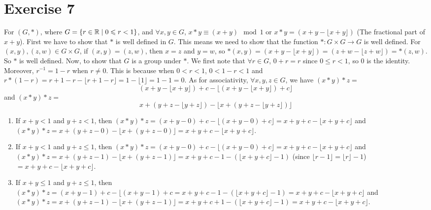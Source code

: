 \documentclass[12pt]{article}
\begin{document}
    \section*{Exercise 7}
    For $(G, \ast)$, where $G = \{r \in \mathbb{R} \mid 0 \leqslant r < 1\}$,
    and $\forall x, y \in G$, 
    $x \ast y \equiv (x + y) \mod{1}$
    or $x \ast y = (x + y - \lfloor x + y \rfloor)$
    (The fractional part of $x + y$).
    First we have to show that $\ast$ is well defined in $G$. 
    This means we need to show that the function $\ast:G \times G \to G$
    is well defined.
    For $(x, y), (z, w) \in G \times G$,
    if $(x, y) = (z, w)$,
    then $x = z$ and $y = w$,
    so $\ast(x, y) 
    = (x + y - \lfloor x + y \rfloor) 
    = (z + w - \lfloor z + w \rfloor) 
    = \ast(z, w)$.
    So $\ast$ is well defined.
    Now, to show that $G$ is a group under $\ast$.
    We first note that $\forall r \in G$, $0 + r = r$
    since $0 \leqslant r < 1$,
    so $0$ is the identity.
    Moreover, $r^{-1} = 1 - r$
    when $r \neq 0$.
    This is because when $0 < r < 1$, $0 < 1 - r < 1$
    and $r \ast (1 - r) 
    = r + 1 - r - \lfloor r + 1 - r \rfloor 
    = 1 - \lfloor 1 \rfloor 
    = 1 - 1 = 0$.
    As for associativity, $\forall x, y, z \in G$,
    we have $(x \ast y) \ast z = $
    \[(x + y - \lfloor x + y \rfloor) + c -
    \lfloor (x + y - \lfloor x + y \rfloor) + c \rfloor\]
    and $(x \ast y) \ast z = $
    \[x + (y + z - \lfloor y + z \rfloor)
    - \lfloor x + (y + z - \lfloor y + z \rfloor) \rfloor\] 
    \begin{enumerate}[label=\textbf{case \arabic*:}]
        \item
            If $x + y < 1$ and $y + z < 1$,
            then $(x \ast y) \ast z 
            = (x + y - 0) + c - \lfloor (x + y - 0) + c \rfloor
            = x + y + c - \lfloor x + y + c \rfloor$
            and $(x \ast y) \ast z 
            = x + (y + z - 0) - \lfloor x + (y + z - 0) \rfloor
            = x + y + c - \lfloor x + y + c \rfloor$.
        \item
            If $x + y < 1$ and $y + z \leqslant 1$,
            then $(x \ast y) \ast z 
            = (x + y - 0) + c - \lfloor (x + y - 0) + c \rfloor
            = x + y + c - \lfloor x + y + c \rfloor$
            and $(x \ast y) \ast z 
            = x + (y + z - 1) - \lfloor x + (y + z - 1) \rfloor
            = x + y + c - 1 - (\lfloor x + y + c \rfloor - 1)$ 
            (since $\lfloor r - 1 \rfloor = \lfloor r \rfloor - 1$)
            $ = x + y + c - \lfloor x + y + c \rfloor$.
        \item
            If $x + y \leqslant 1$ and $y + z \leqslant 1$,
            then $(x \ast y) \ast z
            = (x + y - 1) + c - \lfloor (x + y - 1) + c
            = x + y + c - 1 - (\lfloor x + y + c \rfloor - 1)
            = x + y + c - \lfloor x + y + c \rfloor$
            and $(x \ast y) \ast z
            = x + (y + z - 1) - \lfloor x + (y + z - 1) \rfloor
            = x + y + c + 1 - (\lfloor x + y + c \rfloor - 1)
            = x + y + c - \lfloor x + y + c \rfloor$.
    \end{enumerate}
\end{document}

